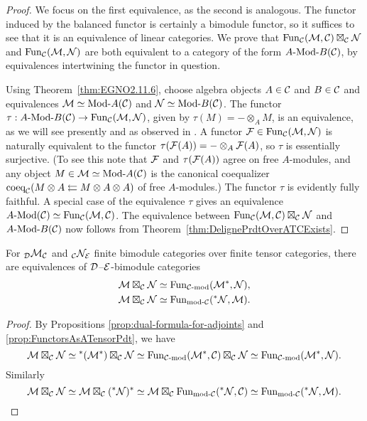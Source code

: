 \documentclass{amsart}
\begin{document}
\begin{proof}
We focus on the first equivalence, as the second is analogous.  The functor induced by the balanced functor is certainly a bimodule functor, so it suffices to see that it is an equivalence of linear categories.  We prove that $\operatorname{Fun}_\mathcal C(\mathcal M, \mathcal C) \boxtimes_\mathcal C \mathcal N$ and $\operatorname{Fun}_\mathcal C(\mathcal M,\mathcal N)$ are both equivalent to a category of the form $\Mod{A}{B}(\cC)$, by equivalences intertwining the functor in question.

Using Theorem~\ref{thm:EGNO2.11.6}, choose algebra objects $A \in \mathcal C$ and $B \in \mathcal C$ and equivalences $\cM \simeq \Mod{}{A}(\cC)$ and $\cN \simeq \Mod{}{B}(\cC)$.  The functor $\tau: \Mod{A}{B}(\cC) \rightarrow \Fun_\cC(\cM,\cN)$, given by $\tau(M) = - \otimes_A M$, is an equivalence, as we will see presently and as observed in \cite[Prop 2.12.2]{EGNO}.  A functor $\mathcal F \in \operatorname{Fun}_\mathcal C(\mathcal M,\mathcal N)$ is naturally equivalent to the functor $\tau(\mathcal F(A)) = - \otimes_A \mathcal F(A)$, so $\tau$ is essentially surjective.  (To see this note that $\mathcal F$ and $\tau(\mathcal F(A))$ agree on free $A$-modules, and any object $M \in \cM \simeq \Mod{}{A}(\cC)$ is the canonical coequalizer $\textrm{coeq}_\mathcal C(M \otimes A \leftleftarrows M \otimes A \otimes A)$ of free $A$-modules.)  The functor $\tau$ is evidently fully faithful.  A special case of the equivalence $\tau$ gives an equivalence $\Mod{A}{}(\cC) \simeq \Fun_\cC(\cM,\cC)$.  The equivalence between $\operatorname{Fun}_\mathcal C(\mathcal M, \mathcal C) \boxtimes_\mathcal C \mathcal N$ and $\Mod{A}{B}(\cC)$ now follows from Theorem~\ref{thm:DelignePrdtOverATCExists}.
\end{proof}

\begin{corollary} \label{cor:tensasfunct}
For ${}_\mathcal D \mathcal M_\mathcal C$ and ${}_\mathcal C \mathcal N_\mathcal E$ finite bimodule categories over finite tensor categories, there are equivalences of $\mathcal D$--$\mathcal E$-bimodule categories
\begin{align*}
\cM \boxtimes_\cC \cN &\simeq \Fun_{\mod{\cC}{}}(\cM^*,\cN), \\
\cM \boxtimes_\cC \cN &\simeq \Fun_{\mod{}{\cC}}({}^* \cN,\cM).
\end{align*}
\end{corollary}
\begin{proof}
By Propositions \ref{prop:dual-formula-for-adjoints} and \ref{prop:FunctorsAsATensorPdt}, we have
\[
\cM \boxtimes_\cC \cN \simeq {}^*(\cM^*) \boxtimes_\cC \cN \simeq \Fun_{\mod{\cC}{}}(\cM^*,\cC) \boxtimes_\cC \cN \simeq \Fun_{\mod{\cC}{}}(\cM^*,\cN).
\]
Similarly
\[
\cM \boxtimes_\cC \cN \simeq \cM \boxtimes_\cC ({}^* \cN)^* \simeq \cM \boxtimes_\cC \Fun_{\mod{}{\cC}}({}^* \cN,\cC) \simeq \Fun_{\mod{}{\cC}}({}^* \cN,\cM).\qedhere
\]
\end{proof}
\end{document}
